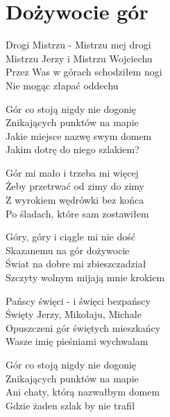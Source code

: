 \section{Dożywocie gór}
\begin{text}
    Drogi Mistrzu - Mistrzu mej drogi\\
    Mistrzu Jerzy i Mistrzu Wojciechu\\
    Przez Was w górach schodziłem nogi\\
    Nie mogąc złapać oddechu

    Gór co stoją nigdy nie dogonię\\
    Znikających punktów na mapie\\
    Jakie miejsce nazwę swym domem\\
    Jakim dotrę do niego szlakiem?\\

\end{text}
\begin{text}
    \vin Gór mi mało i trzeba mi więcej\\
    \vin Żeby przetrwać od zimy do zimy\\
    \vin Z wyrokiem wędrówki bez końca\\
    \vin Po śladach, które sam zostawiłem

    \vin Góry, góry i ciągle mi nie dość\\
    \vin Skazanemu na gór dożywocie\\
    \vin Świat na dobre mi zbieszczadział\\
    \vin Szczyty wolnym mijają mnie krokiem\\

\end{text}
\begin{text}
    Pańscy święci - i święci bezpańscy\\
    Święty Jerzy, Mikołaju, Michale\\
    Opuszczeni gór świętych mieszkańcy\\
    Wasze imię pieśniami wychwalam

    Gór co stoją nigdy nie dogonię\\
    Znikających punktów na mapie\\
    Ani chaty, którą nazwałbym domem\\
    Gdzie żaden szlak by nie trafił\\

\end{text}
